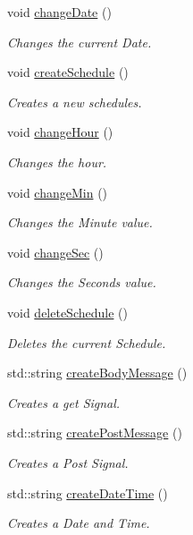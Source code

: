 \begin{DoxyCompactItemize}
void \hyperlink{classSingleSchedulerControlWidget_ac1eb54766118ff619ac32ba3fcbe20ea}{change\+Date} ()
\begin{DoxyCompactList}\small\item\em Changes the current Date. \end{DoxyCompactList}\item 
void \hyperlink{classSingleSchedulerControlWidget_ae35320ca0cbc22ba4ce62376903b3b5f}{create\+Schedule} ()
\begin{DoxyCompactList}\small\item\em Creates a new schedules. \end{DoxyCompactList}\item 
void \hyperlink{classSingleSchedulerControlWidget_aa0130edea1c3391a5ebf488d69a53332}{change\+Hour} ()
\begin{DoxyCompactList}\small\item\em Changes the hour. \end{DoxyCompactList}\item 
void \hyperlink{classSingleSchedulerControlWidget_aab335dfccc70f9ef7ddacc7d30d6e748}{change\+Min} ()
\begin{DoxyCompactList}\small\item\em Changes the Minute value. \end{DoxyCompactList}\item 
void \hyperlink{classSingleSchedulerControlWidget_a017c8666d736327c2df76e951f8131e2}{change\+Sec} ()
\begin{DoxyCompactList}\small\item\em Changes the Seconds value. \end{DoxyCompactList}\item 
void \hyperlink{classSingleSchedulerControlWidget_a70af7b207cc5a43d7063f7bd06012ff5}{delete\+Schedule} ()
\begin{DoxyCompactList}\small\item\em Deletes the current Schedule. \end{DoxyCompactList}\item 
std\+::string \hyperlink{classSingleSchedulerControlWidget_a604bd7d1670fea6bdb16b7f6b8c97af7}{create\+Body\+Message} ()
\begin{DoxyCompactList}\small\item\em Creates a get Signal. \end{DoxyCompactList}\item 
std\+::string \hyperlink{classSingleSchedulerControlWidget_a8839c588eb9605fc6f251eca26556e75}{create\+Post\+Message} ()
\begin{DoxyCompactList}\small\item\em Creates a Post Signal. \end{DoxyCompactList}\item 
std\+::string \hyperlink{classSingleSchedulerControlWidget_a15788c25db43eff41ba2a6da63c5964e}{create\+Date\+Time} ()
\begin{DoxyCompactList}\small\item\em Creates a Date and Time. \end{DoxyCompactList}\end{DoxyCompactItemize}
